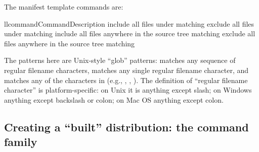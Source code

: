 \documentclass{howto}
\begin{document}
The manifest template commands are:
\begin{tableii}{ll}{command}{Command}{Description}
    {include all files under  matching }
    {exclude all files under  matching }
    {include all files anywhere in the source tree matching }
    {exclude all files anywhere in the source tree matching }
\end{tableii}
The patterns here are Unix-style ``glob'' patterns: \code{*} matches any
sequence of regular filename characters,  matches any single
regular filename character, and  matches any of the
characters in  (e.g., , ,
).  The definition of ``regular filename character'' is
platform-specific: on Unix it is anything except slash; on Windows
anything except backslash or colon; on Mac OS anything except colon.


\subsection{Creating a ``built'' distribution: the \protect{} command
  family}
\label{sec:bdist-cmds}


\subsubsection{\protect{}}

\subsubsection{\protect{}}

\subsubsection{\protect{}}

\subsubsection{\protect{}}
\end{document}
